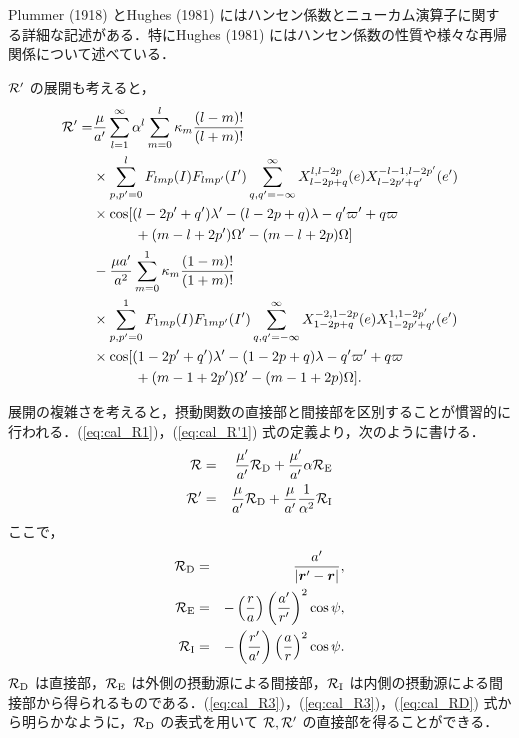 \documentclass[11pt,a4paper,oneside,onecolumn]{jreport}
\begin{document}
Plummer (1918) とHughes (1981) にはハンセン係数とニューカム演算子に関する詳細な記述がある．特にHughes (1981) にはハンセン係数の性質や様々な再帰関係について述べている．

${\cal R'}$ の展開も考えると，
\begin{equation}
\begin{split}
{\cal R'} = & \frac{\mu}{a'} \sum_{l = 1}^{\infty} \alpha^l \sum_{m = 0}^l \kappa_m \frac{(l - m) !}{(l + m) !} \\
& \times \sum_{p,p' = 0}^l F_{lmp} (I) F_{lmp'} (I') \sum_{q,q' = - \infty}^{\infty} X_{l - 2p + q}^{l, l - 2p} (e) X_{l - 2p' + q'}^{-l -1, l - 2p'} (e') \\
& \times \cos [ (l - 2p' + q') \lambda' - (l - 2p + q) \lambda - q' \varpi' + q \varpi \\
& \quad \quad \quad + (m - l + 2p') \Omega' - (m - l + 2p) \Omega ] \\
& - \frac{\mu a'}{a^2} \sum_{m = 0}^1 \kappa_m \frac{(1 - m) !}{(1 + m) !} \\
& \times \sum_{p,p' = 0}^1 F_{1mp} (I) F_{1mp'} (I') \sum_{q,q' = - \infty}^{\infty} X_{1 - 2p + q}^{-2, 1 - 2p} (e) X_{1 - 2p' + q'}^{1, 1 - 2p'} (e') \\
& \times \cos [ (1 - 2p' +q') \lambda' - (1 -2p + q) \lambda - q' \varpi' +q \varpi \\
& \quad \quad \quad + (m - 1 + 2p') \Omega' - (m - 1 + 2p) \Omega ].
\end{split}
\end{equation}

展開の複雑さを考えると，摂動関数の直接部と間接部を区別することが慣習的に行われる．(\ref{eq:cal_R1})，(\ref{eq:cal_R'1}) 式の定義より，次のように書ける．
\begin{eqnarray}
{\cal R} & = & \frac{\mu'}{a'} {\cal R}_{\rm D} + \frac{\mu'}{a'} \alpha {\cal R}_{\rm E} \label{eq:cal_R3} \\
{\cal R'} & = & \frac{\mu}{a'} {\cal R}_{\rm D} + \frac{\mu}{a'} \frac{1}{\alpha^2} {\cal R}_{\rm I} \label{eq:cal_R'3}
\end{eqnarray}
ここで，
\begin{eqnarray}
{\cal R}_{\rm D} & = & \frac{a'}{|{\bm r'} - {\bm r}|}, \label{eq:cal_RD}\\
{\cal R}_{\rm E} & = & - \left( \frac{r}{a} \right) \left( \frac{a'}{r'} \right)^2 \cos \psi, \label{eq:cal_RE} \\
{\cal R}_{\rm I} & = & - \left( \frac{r'}{a'} \right) \left( \frac{a}{r} \right)^2 \cos \psi. \label{eq:cal_RI}
\end{eqnarray}
${\cal R}_{\rm D}$ は直接部，${\cal R}_{\rm E}$ は外側の摂動源による間接部，${\cal R}_{\rm I}$ は内側の摂動源による間接部から得られるものである．(\ref{eq:cal_R3})，(\ref{eq:cal_R3})，(\ref{eq:cal_RD}) 式から明らかなように，${\cal R}_{\rm D}$ の表式を用いて ${\cal R}, {\cal R'}$ の直接部を得ることができる．
\end{document}

